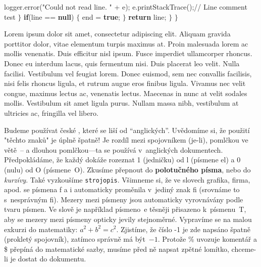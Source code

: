 logger.error({\localcolor \Yellow "Could not read line. "} + e);\codetexNewline
{} e.printStackTrace();{\localcolor \Grey // Line comment test}\codetexNewline
{} $\}$\codetexNewline
{} \codetexNewline
{} {\bf {\localcolor \Blue if}}(line == {\bf {\localcolor \Blue null}}) $\{$\codetexNewline
{} end = {\bf {\localcolor \Blue true}};\codetexNewline
{} $\}$\codetexNewline
{} \codetexNewline
{} {\bf {\localcolor \Blue return}} line;\codetexNewline
{} $\}$\codetexNewline
{} $\}$\codetexNewline
\codetexNewline \typoscale[1250/100000]
\bigbreak

Lorem ipsum dolor sit amet, consectetur adipiscing elit. Aliquam gravida porttitor dolor, vitae elementum turpis maximus at. Proin malesuada lorem ac mollis venenatis. Duis efficitur nisl ipsum. Fusce imperdiet ullamcorper rhoncus. Donec eu interdum lacus, quis fermentum nisi. Duis placerat leo velit. Nulla facilisi. Vestibulum vel feugiat lorem. Donec euismod, sem nec convallis facilisis, nisi felis rhoncus ligula, et rutrum augue eros finibus ligula. Vivamus nec velit congue, maximus lectus ac, venenatis lectus. Maecenas in nunc at velit sodales mollis. Vestibulum sit amet ligula purus. Nullam massa nibh, vestibulum at ultricies ac, fringilla vel libero.

\itemskip
\bod Budeme používat české , které se liší od ``anglických''.
     Uvědomíme si, že použití "těchto znaků" je úplně špatně!
\bod Je rozdíl mezi spojovníkem (je-li), pomlčkou ve větě~--
     a dlouhou pomlčkou---ta se používá v~anglických dokumentech.
\bod Předpokládáme, že každý dokáže rozeznat 1 (jedničku) od l
     (písmene el) a 0 (nulu) od O (písmene~O).
\bod Zkusíme přepnout do {\bf polotučného písma}, nebo do
     {\it kurzívy}. Také vyzkoušíme {\tt strojopis}.
\bod Všimneme si, že ve slovech grafika, firma, apod. se písmena
     f a i automaticky proměnila v~jediný znak fi (srovnáme to
     s~nesprávným f\/i).
\bod Mezery mezi písmeny jsou automaticky vyrovnávány podle tvaru písmen.
     Ve slově  je například písmeno~e těsněji přisazeno
     k~písmenu~T, aby se mezery mezi písmeny opticky jevily stejnoměrné.
\bod Vypravíme se na malou exkurzi do matematiky: $a^2 + b^2 = c^2$.
     Zjistíme, že číslo -1 je zde napsáno špatně (prokletý spojovník),
     zatímco správně má být~$-1$.
\bod Protože \% uvozuje komentář a \$ přepíná do matematické sazby,
     musíme před ně napsat zpětné lomítko, chceme-li je dostat do dokumentu.
\itemskip

